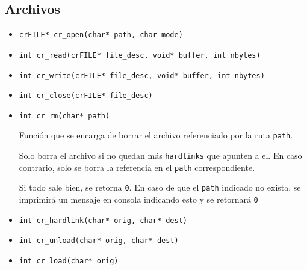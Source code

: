 \documentclass[12pt]{article}
\def\code#1{\texttt{#1}}
\begin{document}
\subsection*{Archivos}
\begin{itemize}
	\item \code{crFILE* cr\_open(char* path, char mode)}
	\item \code{int cr\_read(crFILE* file\_desc, void* buffer, int nbytes)}
	\item \code{int cr\_write(crFILE* file\_desc, void* buffer, int nbytes)}
	\item \code{int cr\_close(crFILE* file\_desc)}
	\item \code{int cr\_rm(char* path)}
	
	Función que se encarga de borrar el archivo referenciado por la ruta \code{path}.

	Solo borra el archivo si no quedan más \code{hardlinks} que apunten a el. En caso contrario, solo se borra la referencia en el \code{path} correspondiente.
	
	Si todo sale bien, se retorna \code{0}. En caso de que el \code{path} indicado no exista, se imprimirá un mensaje en consola indicando esto y se retornará \code{0}
	\item \code{int cr\_hardlink(char* orig, char* dest)}
	\item \code{int cr\_unload(char* orig, char* dest)}
	\item \code{int cr\_load(char* orig)}
\end{itemize}
\end{document}
